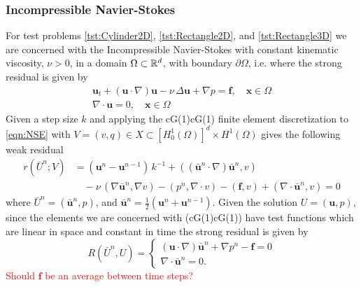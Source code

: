 \subsubsection{Incompressible Navier-Stokes}
For test problems \ref{tst:Cylinder2D}, \ref{tst:Rectangle2D}, and
\ref{tst:Rectangle3D} we are concerned with the Incompressible Navier-Stokes
with constant kinematic viscosity, $\nu>0$, in a domain $\Omega\subset \mathbb{R}^d$,
with boundary $\partial \Omega$, i.e.
where the strong residual is given by
\begin{equation}
    \begin{split}
      \mathbf{u}_t + \left( \mathbf{u} \cdot \nabla \right) \mathbf{u} - \nu\,
          \Delta \mathbf{u} + \nabla p = \mathbf{f}, \quad \mathbf{x} \in \Omega \\
          \nabla \cdot \mathbf{u} = 0, \quad \mathbf{x} \in \Omega
    \end{split}
  \label{eqn:NSE}
\end{equation}
Given a step size $k$ and applying the cG(1)cG(1) finite element discretization
to \eqref{eqn:NSE} with $V = (v, q) \in X \subset [H^1_0(\Omega)]^d \times
H^1(\Omega)$ gives the following weak residual
\begin{equation}
  \begin{split}
    r(\bar{U}^n; V) &= \left(\mathbf{u}^n - \mathbf{u}^{n-1}\right)\,k^{-1}
        + (\left( \bar{\mathbf{u}}^n \cdot \nabla \right) \bar{\mathbf{u}}^n, v) \\
        &\quad- \nu\, (\nabla \bar{\mathbf{u}}^n, \nabla v)
        - (p^n, \nabla \cdot v) - (\mathbf{f}, v)
        + (\nabla \cdot \bar{\mathbf{u}}^n, v) = 0
  \end{split}
  \label{eqn:WeakNSE}
\end{equation}
where $\bar{U}^n = (\bar{\mathbf{u}}^n,p)$, and $\bar{\mathbf{u}}^n =
\frac{1}{2}\left(\mathbf{u}^n + \mathbf{u}^{n-1}\right)$. Given the solution
$U=(\mathbf{u},p)$, since the elements we are concerned with (cG(1)cG(1)) have
test functions which are linear in space and constant in time the strong
residual is given by
\begin{equation}
    R(\bar{U}^n,U) = \begin{cases}
      \left(\mathbf{u} \cdot \nabla \right) \bar{\mathbf{u}}^n
        + \nabla p^n - \mathbf{f} = 0 \\
      \nabla \cdot \bar{\mathbf{u}}^n = 0.
    \end{cases}
  \label{eqn:StrongNSE}
\end{equation}
\textcolor{red}{Should $\mathbf{f}$ be an average between time steps?}
